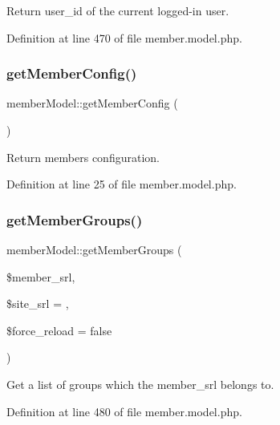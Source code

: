 Return user\+\_\+id of the current logged-\/in user. 



Definition at line 470 of file member.\+model.\+php.

\mbox{\label{classmemberModel_a063f34e0a57f8e1c2737318ecd6db8c7}} 
\subsubsection{\texorpdfstring{get\+Member\+Config()}{getMemberConfig()}}
{\footnotesize\ttfamily member\+Model\+::get\+Member\+Config (\begin{DoxyParamCaption}{ }\end{DoxyParamCaption})}



Return member\textquotesingle{}s configuration. 



Definition at line 25 of file member.\+model.\+php.

\mbox{\label{classmemberModel_a0e6c68ca86056aaa63a5171704df8367}} 
\subsubsection{\texorpdfstring{get\+Member\+Groups()}{getMemberGroups()}}
{\footnotesize\ttfamily member\+Model\+::get\+Member\+Groups (\begin{DoxyParamCaption}\item[{}]{\$member\+\_\+srl,  }\item[{}]{\$site\+\_\+srl = {},  }\item[{}]{\$force\+\_\+reload = {\ttfamily false} }\end{DoxyParamCaption})}



Get a list of groups which the member\+\_\+srl belongs to. 



Definition at line 480 of file member.\+model.\+php.

\mbox{\label{classmemberModel_a24c934744cc3cc540533312463a63026}} 
